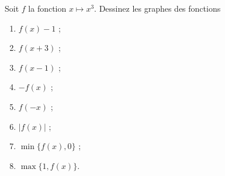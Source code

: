 
\begin{exercice}[\boringexo]\label{exoTD1_4}

Soit $f$ la fonction $x\mapsto x^3$. Dessinez les graphes des fonctions 
\begin{enumerate}
\item $f(x)-1$ ;
  \item $f(x+3)$ ;
    \item  $f(x-1)$ ;
      \item  $-f(x)$ ;
        \item  $f(-x)$ ;
          \item $|f(x)|$ ;
            \item $\min\{f(x), 0\}$ ;
              \item $\max\{1, f(x)\}$.
\end{enumerate}
  


\end{exercice}
